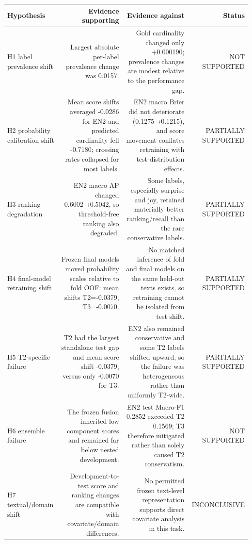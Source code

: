 \begin{tabular}{lrrr}
\toprule
Hypothesis & Evidence supporting & Evidence against & Status \\
\midrule
H1 label prevalence shift & Largest absolute per-label prevalence change was 0.0157. & Gold cardinality changed only +0.000190; prevalence changes are modest relative to the performance gap. & NOT SUPPORTED \\
H2 probability calibration shift & Mean score shifts averaged -0.0286 for EN2 and predicted cardinality fell -0.7180; crossing rates collapsed for most labels. & EN2 macro Brier did not deteriorate (0.1275→0.1215), and score movement conflates retraining with test-distribution effects. & PARTIALLY SUPPORTED \\
H3 ranking degradation & EN2 macro AP changed 0.6002→0.5042, so threshold-free ranking also degraded. & Some labels, especially surprise and joy, retained materially better ranking/recall than the rare conservative labels. & PARTIALLY SUPPORTED \\
H4 final-model retraining shift & Frozen final models moved probability scales relative to fold OOF: mean shifts T2=-0.0379, T3=-0.0070. & No matched inference of fold and final models on the same held-out texts exists, so retraining cannot be isolated from test shift. & PARTIALLY SUPPORTED \\
H5 T2-specific failure & T2 had the largest standalone test gap and mean score shift -0.0379, versus only -0.0070 for T3. & EN2 also remained conservative and some T2 labels shifted upward, so the failure was heterogeneous rather than uniformly T2-wide. & PARTIALLY SUPPORTED \\
H6 ensemble failure & The frozen fusion inherited low component scores and remained far below nested development. & EN2 test Macro-F1 0.2852 exceeded T2 0.1569; T3 therefore mitigated rather than solely caused T2 conservatism. & NOT SUPPORTED \\
H7 textual/domain shift & Development-to-test score and ranking changes are compatible with covariate/domain differences. & No permitted frozen text-level representation supports direct covariate analysis in this task. & INCONCLUSIVE \\
\bottomrule
\end{tabular}
